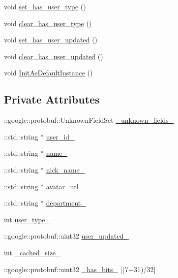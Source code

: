 \begin{DoxyCompactItemize}
void \hyperlink{class_i_m_1_1_base_define_1_1_client_user_info_a9a1376d002f81576862e318dba305905}{set\+\_\+has\+\_\+user\+\_\+type} ()
\item 
void \hyperlink{class_i_m_1_1_base_define_1_1_client_user_info_a074def587099ade2be07dc2d4b73e791}{clear\+\_\+has\+\_\+user\+\_\+type} ()
\item 
void \hyperlink{class_i_m_1_1_base_define_1_1_client_user_info_a690604dbfa7abf5531654ab986f8928f}{set\+\_\+has\+\_\+user\+\_\+updated} ()
\item 
void \hyperlink{class_i_m_1_1_base_define_1_1_client_user_info_af36bbf6acd5830777a94f357b34289d3}{clear\+\_\+has\+\_\+user\+\_\+updated} ()
\item 
void \hyperlink{class_i_m_1_1_base_define_1_1_client_user_info_ad82e57e96d2aa1533eb000a80493d26a}{Init\+As\+Default\+Instance} ()
\end{DoxyCompactItemize}
\subsection*{Private Attributes}
\begin{DoxyCompactItemize}
\item 
\+::google\+::protobuf\+::\+Unknown\+Field\+Set \hyperlink{class_i_m_1_1_base_define_1_1_client_user_info_a59978a6c965ad3553f70d67b83c1cdf7}{\+\_\+unknown\+\_\+fields\+\_\+}
\item 
\+::std\+::string $\ast$ \hyperlink{class_i_m_1_1_base_define_1_1_client_user_info_a1233e9dc6db5c1a98590cd80e1e9ebc2}{user\+\_\+id\+\_\+}
\item 
\+::std\+::string $\ast$ \hyperlink{class_i_m_1_1_base_define_1_1_client_user_info_a8276e733ca78680ffafcebe17c270d03}{name\+\_\+}
\item 
\+::std\+::string $\ast$ \hyperlink{class_i_m_1_1_base_define_1_1_client_user_info_a32dc77b738d431912f6c8500689bf56b}{nick\+\_\+name\+\_\+}
\item 
\+::std\+::string $\ast$ \hyperlink{class_i_m_1_1_base_define_1_1_client_user_info_a4ec1a055b9b668de407ea14260e4700d}{avatar\+\_\+url\+\_\+}
\item 
\+::std\+::string $\ast$ \hyperlink{class_i_m_1_1_base_define_1_1_client_user_info_a822a2bcaa7f3346e066b6210f4502d41}{department\+\_\+}
\item 
int \hyperlink{class_i_m_1_1_base_define_1_1_client_user_info_a026e1ee25bd0147a4aa462944ec4d621}{user\+\_\+type\+\_\+}
\item 
\+::google\+::protobuf\+::uint32 \hyperlink{class_i_m_1_1_base_define_1_1_client_user_info_acbc2c96a99cf041db139b2a9e7143e1c}{user\+\_\+updated\+\_\+}
\item 
int \hyperlink{class_i_m_1_1_base_define_1_1_client_user_info_a2ef72cbeda5d69b8f7e4d65531d5608a}{\+\_\+cached\+\_\+size\+\_\+}
\item 
\+::google\+::protobuf\+::uint32 \hyperlink{class_i_m_1_1_base_define_1_1_client_user_info_aef0781d8e204189ccdb33e50a8ce81de}{\+\_\+has\+\_\+bits\+\_\+} \mbox{[}(7+31)/32\mbox{]}
\end{DoxyCompactItemize}
